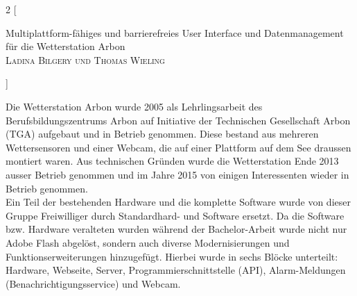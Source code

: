 \documentclass[11pt]{article}
\begin{document}
\begin{multicols}{2}
[
    \begin{center}
      {\huge\sffamily Multiplattform-fähiges und barrierefreies User Interface und Datenmanagement für die Wetterstation Arbon}\\
       \vspace{2ex}
       \textsc{Ladina Bilgery und Thomas Wieling}
    \end{center}
]


Die Wetterstation Arbon wurde 2005 als Lehrlingsarbeit des Berufsbildungszentrums Arbon auf Initiative der Technischen Gesellschaft Arbon (TGA) aufgebaut und in Betrieb genommen. Diese bestand aus mehreren Wettersensoren und einer Webcam, die auf einer Plattform auf dem See draussen montiert waren. Aus technischen Gründen wurde die Wetterstation Ende 2013 ausser Betrieb genommen und im Jahre 2015 von einigen Interessenten wieder in Betrieb genommen.\\
Ein Teil der  bestehenden Hardware und die komplette Software wurde von dieser Gruppe Freiwilliger durch Standardhard- und Software ersetzt. Da die Software bzw. Hardware veralteten wurden während der Bachelor-Arbeit wurde nicht nur Adobe Flash abgelöst, sondern auch diverse Modernisierungen und Funktionserweiterungen hinzugefügt. Hierbei wurde in sechs Blöcke unterteilt: Hardware, Webseite, Server, Programmierschnittstelle (API), Alarm-Meldungen (Benachrichtigungsservice) und Webcam.\\


\end{multicols}
\end{document}
